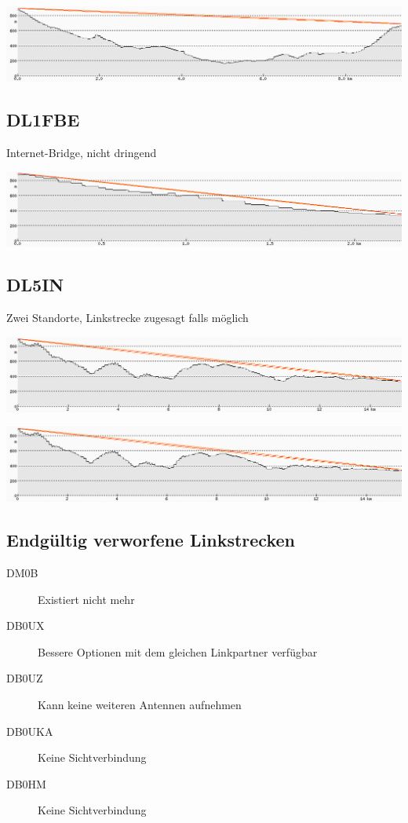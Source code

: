\documentclass[a4paper]{scrartcl}
\begin{document}
\includegraphics[width=\linewidth]{Bilder/Profil_DB0SWF}

\subsection{DL1FBE}
Internet-Bridge, nicht dringend

\includegraphics[width=\linewidth]{Bilder/Profil_DL1FBE}

\subsection{DL5IN}
Zwei Standorte, Linkstrecke zugesagt falls m\"oglich

\includegraphics[width=\linewidth]{Bilder/Profil_DL5IN_48_877408_8_507792.png}

\includegraphics[width=\linewidth]{Bilder/Profil_DL5IN_48_877956_8_511058.png}

\subsection{Endg\"ultig verworfene Linkstrecken}
\begin{description}
    \item[DM0B] Existiert nicht mehr
    \item[DB0UX] Bessere Optionen mit dem gleichen Linkpartner verf\"ugbar
    \item[DB0UZ] Kann keine weiteren Antennen aufnehmen
    \item[DB0UKA] Keine Sichtverbindung
    \item[DB0HM] Keine Sichtverbindung
\end{description}
\end{document}
